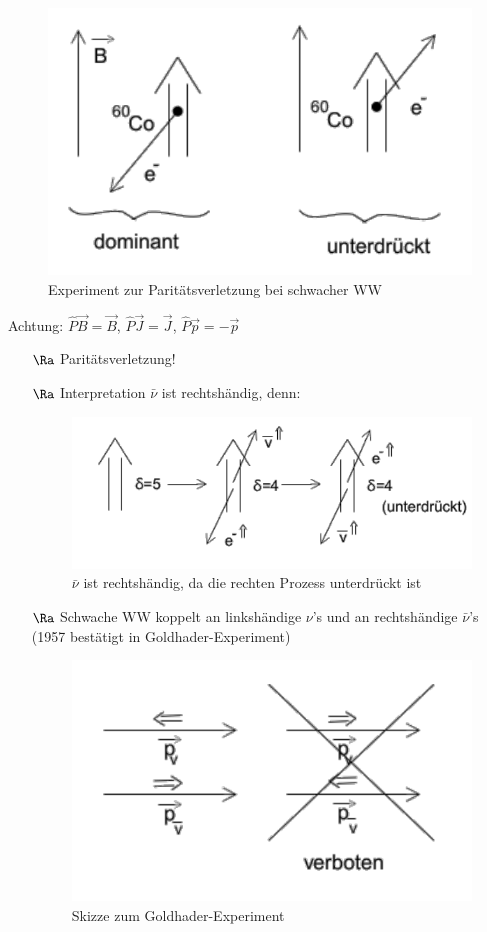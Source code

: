 \begin{figure}[!ht]
\centering
\includegraphics[width=.5\textwidth]{imgs/ep5-fig-8-5.pdf}
\caption{Experiment zur Paritätsverletzung bei schwacher WW\label{fig:8.5}}
\end{figure}
\newpage
Achtung: $\hat{P} \vec{B} = \vec{B}$, $\hat{P} \vec{J} = \vec{J}$, $\hat{P}\vec{p} = - \vec{p}$
\begin{itemize}
\item[$\Ra$] Paritätsverletzung!
\item[$\Ra$] Interpretation $\bar{\nu}$ ist rechtshändig, denn:

\begin{figure}[!ht]
\centering
\includegraphics[width=.5\textwidth]{imgs/ep5-fig-8-6.pdf}
\caption{$\bar{\nu}$ ist rechtshändig, da die rechten Prozess unterdrückt ist \label{fig:8.6}}
\end{figure}
\item[$\Ra$] Schwache WW koppelt an linkshändige $\nu$'s und an rechtshändige $\bar{\nu}$'s\\
(1957 bestätigt in Goldhader-Experiment)

\begin{figure}[!ht]
\centering
\includegraphics[width=.65\textwidth]{imgs/ep5-fig-8-7.pdf}
\caption{Skizze zum Goldhader-Experiment \label{fig:8.7}}
\end{figure}


\end{itemize}
